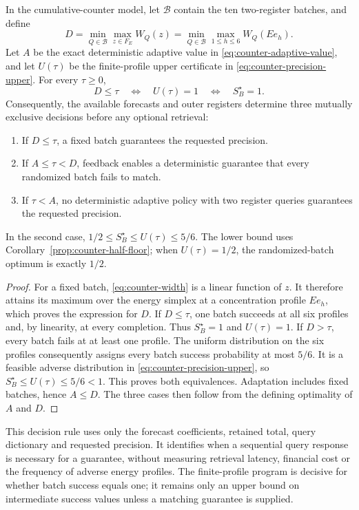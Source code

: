 \begin{corollary}
\label{cor:counter-feedback-triage}
In the cumulative-counter model, let $\mathcal B$ contain the ten
two-register batches, and define
\[
 D=\min_{Q\in\mathcal B}\max_{z\in F_E}W_Q(z)
   =\min_{Q\in\mathcal B}\max_{1\leq h\leq6}W_Q(Ee_h).
\]
Let $A$ be the exact deterministic adaptive value in
\eqref{eq:counter-adaptive-value}, and let $U(\tau)$ be the
finite-profile upper certificate in \eqref{eq:counter-precision-upper}.
For every $\tau\geq0$,
\[
 D\leq\tau
 \quad\Longleftrightarrow\quad U(\tau)=1
 \quad\Longleftrightarrow\quad S_B^\star=1.
\]
Consequently, the available forecasts and outer registers determine
three mutually exclusive decisions before any optional retrieval:
\begin{enumerate}
\item If $D\leq\tau$, a fixed batch guarantees the requested precision.
\item If $A\leq\tau<D$, feedback enables a deterministic guarantee that
      every randomized batch fails to match.
\item If $\tau<A$, no deterministic adaptive policy with two register
      queries guarantees the requested precision.
\end{enumerate}
In the second case,
$1/2\leq S_B^\star\leq U(\tau)\leq5/6$.
The lower bound uses Corollary~\ref{prop:counter-half-floor}; when
$U(\tau)=1/2$, the randomized-batch optimum is exactly $1/2$.
\end{corollary}
\begin{proof}
For a fixed batch, \eqref{eq:counter-width} is a linear function of
$z$. It therefore attains its maximum over the energy simplex at a
concentration profile $Ee_h$, which proves the expression for $D$.
If $D\leq\tau$, one batch succeeds at all six profiles and, by
linearity, at every completion. Thus $S_B^\star=1$ and $U(\tau)=1$.
If $D>\tau$, every batch fails at at least one profile. The uniform
distribution on the six profiles consequently assigns every batch
success probability at most $5/6$. It is a feasible adverse distribution
in \eqref{eq:counter-precision-upper}, so
$S_B^\star\leq U(\tau)\leq5/6<1$. This proves both equivalences.
Adaptation includes fixed batches, hence $A\leq D$. The three cases
then follow from the defining optimality of $A$ and $D$.
\end{proof}

This decision rule uses only the forecast coefficients, retained total,
query dictionary and requested precision. It identifies when a sequential
query response is necessary for a guarantee, without measuring retrieval
latency, financial cost or the frequency of adverse energy profiles.
The finite-profile program is decisive for whether batch success equals
one; it remains only an upper bound on intermediate success values unless
a matching guarantee is supplied.
